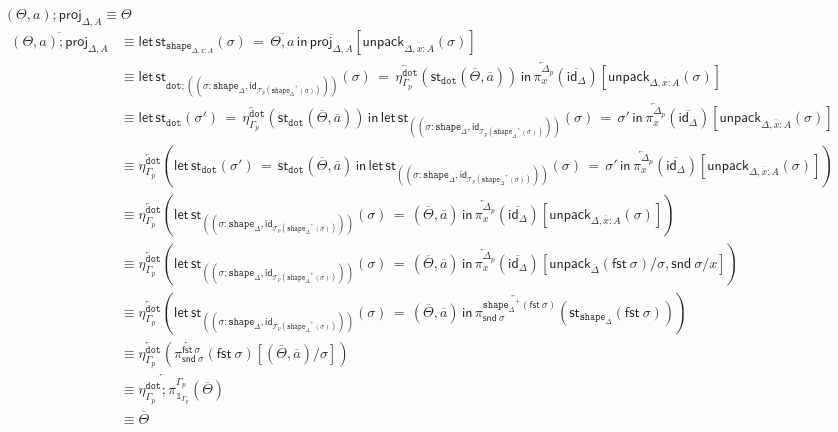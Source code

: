 \documentclass[10pt]{article}
\theoremstyle{definition}
\newcommand\dsd[1]{\ensuremath{\mathsf{#1}}}
\newcommand{\app}[2]{\ensuremath{#1 \: #2}}
\newcommand{\sigmacl}[3]{\ensuremath{(#1{:}#2,#3)}}
\newcommand{\fst}[1]{\app{\dsd{fst}}{#1}}
\newcommand{\snd}[1]{\app{\dsd{snd}}{#1}}
\newcommand{\id}{\mathsf{id}}
\newcommand{\rewrite}[2]{\overleftarrow{#1}(#2)}
\newcommand\StI[2]{\ensuremath{\mathsf{st}_{#1}(#2)}}
\newcommand\StE[4]{\ensuremath{\mathsf{let} \, \StI{#1}{#3} \, = \, {#2} \, \mathsf{in} \, #4}}
\newcommand\TrPlus[2]{\ensuremath{{#1}^+(#2)}}
\newcommand\El[2]{\mathcal{T}_{#1}(#2)}
\newcommand\unpack[2]{\ensuremath{\mathsf{unpack}_{#1}(#2)}}
\newcommand{\modeof}[1]{{#1}_p}
\newcommand{\tdot}{\ensuremath{\mathtt{dot}}}
\newcommand{\tshape}[1]{\ensuremath{\mathtt{shape}_{#1}}}
\newcommand{\upstairs}[1]{\overline{#1}}
\newcommand\proj[1]{\ensuremath{\mathsf{proj}_{#1}}}
\newcommand\One{\ensuremath{\mathds{1}}}
\begin{document}
\begin{enumerate}[style = multiline, labelwidth = 80pt]
\item[{$(\Theta, a);\proj{\Delta,A} \equiv \Theta$}]
\begin{align*}
\upstairs{(\Theta, a);\proj{\Delta,A}}
&\equiv \StE{\tshape{\Delta, x : A}}{\upstairs{\Theta, a}}{\sigma}{\upstairs{\proj{\Delta,A}}[\unpack{\upstairs{\Delta, x : A}}{\sigma}]} \\
&\equiv \StE{\tdot ; (\sigmacl{\sigma}{\tshape{\Delta}}{\id_{\El{p}{\TrPlus{\tshape{\Delta}}{\sigma}}}})}{\rewrite{\eta^\tdot_{\modeof{\Gamma}}}{\StI{\tdot}{\upstairs{\Theta}, \upstairs{a}}}}{\sigma}{\rewrite{\pi^{\modeof{\Delta}}_x}{\upstairs{\id_\Delta}}[\unpack{\upstairs{\Delta, x : A}}{\sigma}]} \\
&\equiv \StE{\tdot}{\rewrite{\eta^\tdot_{\modeof{\Gamma}}}{\StI{\tdot}{\upstairs{\Theta}, \upstairs{a}}}}{\sigma'}{\StE{(\sigmacl{\sigma}{\tshape{\Delta}}{\id_{\El{p}{\TrPlus{\tshape{\Delta}}{\sigma}}}})}{\sigma'}{\sigma}{\rewrite{\pi^{\modeof{\Delta}}_x}{\upstairs{\id_\Delta}}[\unpack{\upstairs{\Delta, x : A}}{\sigma}]}} \\
&\equiv \rewrite{\eta^\tdot_{\modeof{\Gamma}}}{\StE{\tdot}{\StI{\tdot}{\upstairs{\Theta}, \upstairs{a}}}{\sigma'}{\StE{(\sigmacl{\sigma}{\tshape{\Delta}}{\id_{\El{p}{\TrPlus{\tshape{\Delta}}{\sigma}}}})}{\sigma'}{\sigma}{\rewrite{\pi^{\modeof{\Delta}}_x}{\upstairs{\id_\Delta}}[\unpack{\upstairs{\Delta, x : A}}{\sigma}]}}} \\
&\equiv \rewrite{\eta^\tdot_{\modeof{\Gamma}}}{\StE{(\sigmacl{\sigma}{\tshape{\Delta}}{\id_{\El{p}{\TrPlus{\tshape{\Delta}}{\sigma}}}})}{(\upstairs{\Theta}, \upstairs{a})}{\sigma}{\rewrite{\pi^{\modeof{\Delta}}_x}{\upstairs{\id_\Delta}}[\unpack{\upstairs{\Delta, x : A}}{\sigma}]}} \\
&\equiv \rewrite{\eta^\tdot_{\modeof{\Gamma}}}{\StE{(\sigmacl{\sigma}{\tshape{\Delta}}{\id_{\El{p}{\TrPlus{\tshape{\Delta}}{\sigma}}}})}{(\upstairs{\Theta}, \upstairs{a})}{\sigma}{\rewrite{\pi^{\modeof{\Delta}}_x}{\upstairs{\id_\Delta}}[\unpack{\upstairs{\Delta}}{\fst \sigma}/\sigma, \snd \sigma / x]}} \\
&\equiv \rewrite{\eta^\tdot_{\modeof{\Gamma}}}{\StE{(\sigmacl{\sigma}{\tshape{\Delta}}{\id_{\El{p}{\TrPlus{\tshape{\Delta}}{\sigma}}}})}{(\upstairs{\Theta}, \upstairs{a})}{\sigma}{\rewrite{\pi^{\TrPlus{\tshape{\Delta}}{\fst \sigma}}_{\snd \sigma}}{\StI{\tshape{\Delta}}{\fst \sigma}}}} \\
&\equiv \rewrite{\eta^\tdot_{\modeof{\Gamma}}}{\rewrite{\pi^{\fst \sigma}_{\snd \sigma}}{\fst \sigma}[(\upstairs{\Theta}, \upstairs{a})/\sigma]} \\
&\equiv \rewrite{\eta^\tdot_{\modeof{\Gamma}};\pi^{\modeof{\Gamma}}_{\One_{\modeof{\Gamma}}}}{\upstairs{\Theta}} \\
&\equiv \upstairs{\Theta}
\end{align*}


\end{enumerate}
\end{document}
